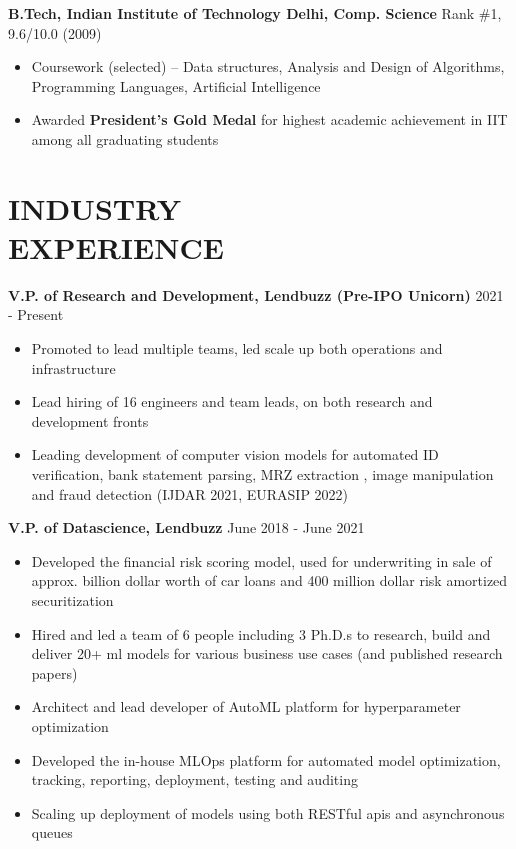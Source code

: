 \documentclass[margin, 10pt]{res} %
\begin{document}
\begin{resume}
{\bf B.Tech, Indian Institute of Technology Delhi, Comp. Science} \hfill Rank \#1, 9.6/10.0 (2009)
\begin{itemize}
\item Coursework (selected) – Data structures, Analysis and Design of Algorithms, Programming Languages, Artificial Intelligence
\item Awarded \textbf{President’s Gold Medal} for highest academic achievement in IIT among all graduating students
\end{itemize} 


\section{INDUSTRY \\EXPERIENCE}


{\bf V.P. of Research and Development, Lendbuzz (Pre-IPO Unicorn)} \hfill 2021 - Present 
\begin{itemize}
\item Promoted to lead multiple teams, led scale up both operations and infrastructure
\item Lead hiring of 16 engineers and team leads, on both research and development fronts
\item Leading development of computer vision models for automated ID verification, bank statement parsing, MRZ extraction , image manipulation and fraud detection (IJDAR 2021,  EURASIP 2022)
\end{itemize} 

{\bf V.P. of Datascience, Lendbuzz} \hfill June 2018 - June 2021
\begin{itemize}
\item Developed the financial risk scoring model, used for underwriting in sale of approx. billion dollar worth of car loans and 400 million dollar risk amortized securitization
\item Hired and led a team of 6 people including 3 Ph.D.s to research, build and deliver 20+ ml models for various business use cases (and published research papers)
\item Architect and lead developer of AutoML platform for hyperparameter optimization
\item Developed the in-house MLOps platform for automated model optimization, tracking, reporting, deployment, testing and auditing
\item Scaling up deployment of models using both RESTful apis and asynchronous queues
\end{itemize} 


\end{resume}
\end{document}
